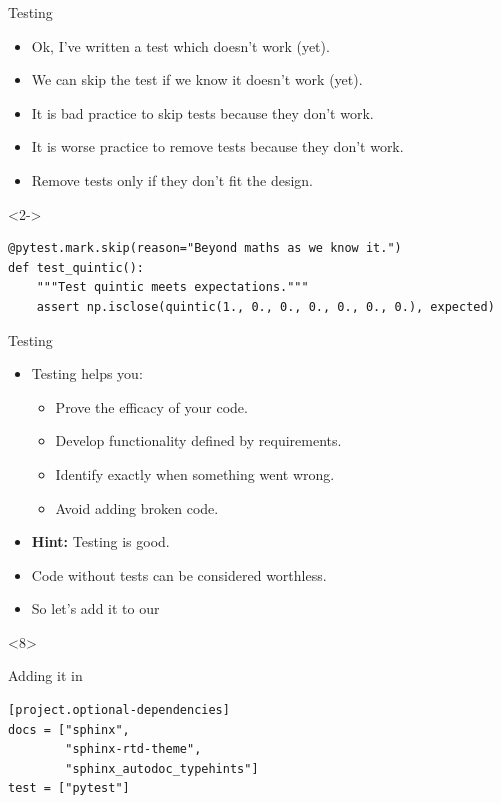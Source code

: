 \documentclass[usenames,dvipsnames]{beamer}
\newcommand{\filet}[1]{\textcolor{blue}{\texttt{\detokenize{#1}}}}
\begin{document}
\begin{frame}[fragile]{Testing}
    \begin{itemize}[<+->]
        \item{}Ok, I've written a test which doesn't work (yet).
        \item{}We can skip the test if we know it doesn't work (yet).
        \item{}It is bad practice to skip tests because they don't work.
        \item{}It is worse practice to remove tests because they don't work.
        \item{}Remove tests only if they don't fit the design.
    \end{itemize}

    \begin{onlyenv}<2->
        \begin{lstlisting}[basicstyle=\scriptsize]
@pytest.mark.skip(reason="Beyond maths as we know it.") 
def test_quintic():
    """Test quintic meets expectations."""
    assert np.isclose(quintic(1., 0., 0., 0., 0., 0., 0.), expected)
        \end{lstlisting}
    \end{onlyenv}
\end{frame}

\begin{frame}[fragile]{Testing}
    \begin{itemize}[<+->]
        \item{}Testing helps you:
        \begin{itemize}
            \item{}Prove the efficacy of your code.
            \item{}Develop functionality defined by requirements.
            \item{}Identify exactly when something went wrong.
            \item{}Avoid adding broken code.
        \end{itemize}
        \item{}\textbf{Hint:} Testing is good.
        \item{}Code without tests can be considered worthless.
        \item{}So let's add it to our \filet{pyproject.toml}
    \end{itemize}

    \begin{onlyenv}<8>
        \begin{block}{Adding it in}
            \begin{lstlisting}[basicstyle=\scriptsize]
[project.optional-dependencies]
docs = ["sphinx",
        "sphinx-rtd-theme", 
        "sphinx_autodoc_typehints"]
test = ["pytest"]
            \end{lstlisting}
        \end{block}
    \end{onlyenv}

\end{frame}
\end{document}
